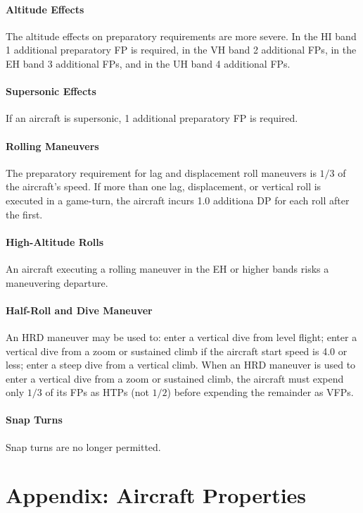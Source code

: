 \documentclass[10pt]{article}
\begin{document}
\paragraph{Altitude Effects} The altitude effects on preparatory requirements are more severe. In the HI band 1 additional preparatory FP is required, in the VH band 2 additional FPs, in the EH band 3 additional FPs, and in the UH band 4 additional FPs.

\paragraph{Supersonic Effects} If an aircraft is supersonic, 1 additional preparatory FP is required.

\paragraph{Rolling Maneuvers} The preparatory requirement for lag and displacement roll maneuvers is $1/3$ of the aircraft's speed. If more than one lag, displacement, or vertical roll is executed in a game-turn, the aircraft incurs 1.0 additiona DP for each roll after the first.

\paragraph{High-Altitude Rolls} An aircraft executing a rolling maneuver in the EH or higher bands risks a maneuvering departure.

\paragraph{Half-Roll and Dive Maneuver} An HRD maneuver may be used to: enter a vertical dive from level flight; enter a vertical dive from a zoom or sustained climb if the aircraft start speed is 4.0 or less; enter a steep dive from a vertical climb. When an HRD maneuver is used to enter a vertical dive from a zoom or sustained climb, the aircraft must expend only $1/3$ of its FPs as HTPs (not $1/2$) before expending the remainder as VFPs.

\paragraph{Snap Turns} Snap turns are no longer permitted.

\section{Appendix: Aircraft Properties}
\end{document}
